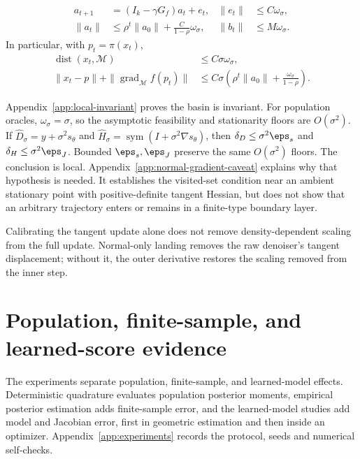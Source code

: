 \documentclass[10pt]{article}
\theoremstyle{c2fup}
\newcommand{\M}{\mathcal{M}}
\newcommand{\dist}{\operatorname{dist}}
\newcommand{\grad}{\operatorname{grad}}
\begin{document}
\begin{corollary}
\begin{align}
  a_{t+1}
  &=(I_k-\gamma G_f)a_t+e_t,
  &\|e_t\|&\le C\omega_\sigma,
  \label{eq:local-recurrence}\\
  \|a_t\|
  &\le\rho^t\|a_0\|
    +\frac{C}{1-\rho}\omega_\sigma,
  &\|b_t\|&\le M\omega_\sigma.
  \label{eq:local-coordinate-bounds}
\end{align}
In particular, with $p_t=\pi(x_t)$,
\begin{align}
  \dist(x_t,\M)
  &\le C\sigma\omega_\sigma,\label{eq:local-feasibility}\\
  \|x_t-p\|+\|\grad_\M f(p_t)\|
  &\le
  C\sigma\left(
    \rho^t\|a_0\|+\frac{\omega_\sigma}{1-\rho}
  \right).
  \label{eq:local-stationarity}
\end{align}
\end{corollary}

Appendix~\ref{app:local-invariant} proves the basin is invariant.  For population
oracles, $\omega_\sigma=\sigma$, so the asymptotic
feasibility and stationarity floors are $O(\sigma^2)$.  If
$\widehat D_\sigma=y+\sigma^2s_\theta$ and
$\widehat H_\sigma=\operatorname{sym}(I+\sigma^2\nabla s_\theta)$, then
$\delta_D\le\sigma^2\eps_s$ and $\delta_H\le\sigma^2\eps_J$.  Bounded
$\eps_s,\eps_J$ preserve the same $O(\sigma^2)$ floors.  The conclusion is local.  Appendix~\ref{app:normal-gradient-caveat} explains why that hypothesis is needed.  It establishes the visited-set condition near an ambient stationary point with positive-definite tangent Hessian, but does not show that an arbitrary trajectory enters or remains in a finite-type boundary layer.

\begin{takeawaybox}
Calibrating the tangent update alone does not remove density-dependent scaling from the full update.  Normal-only landing removes the raw denoiser's tangent displacement; without it, the outer derivative restores the scaling removed from the inner step.
\end{takeawaybox}

\section{Population, finite-sample, and learned-score evidence}
\label{sec:experiments}

The experiments separate population, finite-sample, and learned-model effects.  Deterministic quadrature evaluates population posterior moments, empirical posterior estimation adds finite-sample error, and the learned-model studies add model and Jacobian error, first in geometric estimation and then inside an optimizer.  Appendix~\ref{app:experiments} records the protocol, seeds and numerical self-checks.
\end{document}
